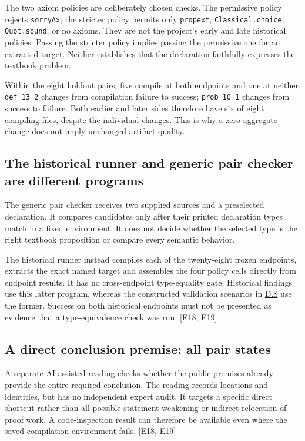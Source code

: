 The two axiom policies are deliberately chosen checks. The permissive policy rejects \nolinkurl{sorryAx}; the stricter policy permits only \nolinkurl{propext}, \nolinkurl{Classical.choice}, \nolinkurl{Quot.sound}, or no axioms. They are not the project's early and late historical policies. Passing the stricter policy implies passing the permissive one for an extracted target. Neither establishes that the declaration faithfully expresses the textbook problem.

Within the eight holdout pairs, five compile at both endpoints and one at neither. \nolinkurl{def_13_2} changes from compilation failure to success; \nolinkurl{prob_10_1} changes from success to failure. Both earlier and later sides therefore have six of eight compiling files, despite the individual changes. This is why a zero aggregate change does not imply unchanged artifact quality.

\subsection[The historical runner and generic pair checker are different programs]{\texorpdfstring{\protect\hypertarget{d3}{}The historical runner and generic pair checker are different programs}{The historical runner and generic pair checker are different programs}}
The generic pair checker receives two supplied sources and a preselected declaration. It compares candidates only after their printed declaration types match in a fixed environment. It does not decide whether the selected type is the right textbook proposition or compare every semantic behavior.

The historical runner instead compiles each of the twenty-eight frozen endpoints, extracts the exact named target and assembles the four policy cells directly from endpoint results. It has no cross-endpoint type-equality gate. Historical findings use this latter program, whereas the constructed validation scenarios in \hyperlink{d8}{D.8} use the former. Success on both historical endpoints must not be presented as evidence that a type-equivalence check was run. [E18, E19]

\subsection[A direct conclusion premise: all pair states]{\texorpdfstring{\protect\hypertarget{d4}{}A direct conclusion premise: all pair states}{A direct conclusion premise: all pair states}}
A separate AI-assisted reading checks whether the public premises already provide the entire required conclusion. The reading records locations and identities, but has no independent expert audit. It targets a specific direct shortcut rather than all possible statement weakening or indirect relocation of proof work. A code-inspection result can therefore be available even where the saved compilation environment fails. [E18, E19]

